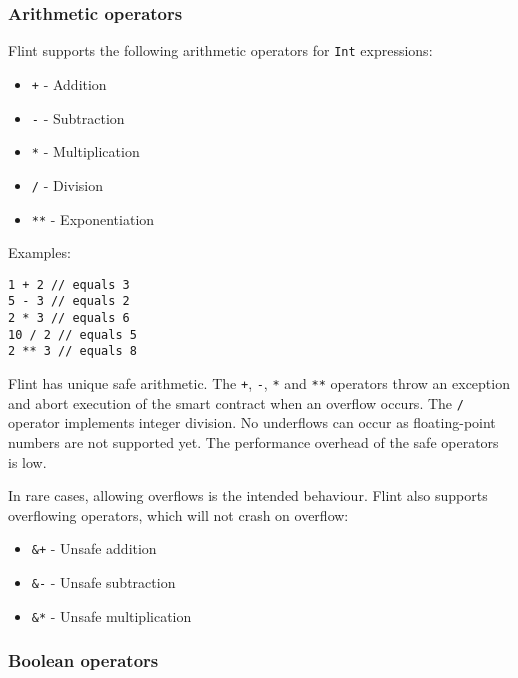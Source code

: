 \subsubsection{Arithmetic operators}
\label{sec:appendix-b-arithmetic-operators}

Flint supports the following arithmetic operators for \texttt{Int} expressions:

\begin{itemize}
	\item \texttt{+} - Addition
	\item \texttt{-} - Subtraction
	\item \texttt{*} - Multiplication
	\item \texttt{/} - Division
	\item \texttt{**} - Exponentiation
\end{itemize}

Examples:

\begin{verbatim}
1 + 2 // equals 3
5 - 3 // equals 2
2 * 3 // equals 6
10 / 2 // equals 5
2 ** 3 // equals 8
\end{verbatim}

Flint has unique safe arithmetic. The \texttt{+}, \texttt{-}, \texttt{*} and \texttt{**} operators throw an exception and abort execution of the smart contract when an overflow occurs. The \texttt{/} operator implements integer division. No underflows can occur as floating-point numbers are not supported yet. The performance overhead of the safe operators is low.

In rare cases, allowing overflows is the intended behaviour. Flint also supports
overflowing operators, which will not crash on overflow:

\begin{itemize}
	\item \texttt{&+} - Unsafe addition
	\item \texttt{&-} - Unsafe subtraction
	\item \texttt{&*} - Unsafe multiplication
\end{itemize}

\subsubsection{Boolean operators}
\label{sec:appendix-b-boolean-operators}

